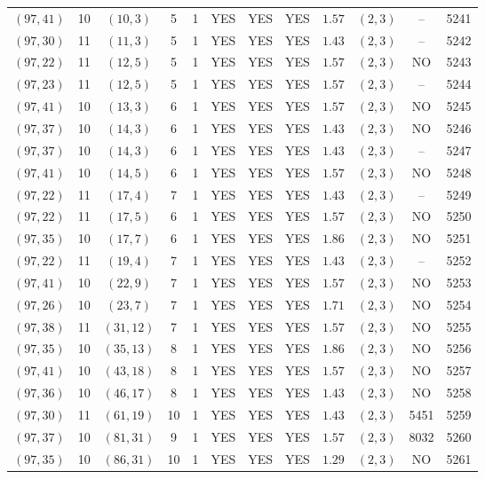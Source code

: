 \begin{longtable}{|c|c|c|c|c|c|c|c|c|c|c|c|}
$(97,41)$ & 10 & $(10,3)$ & 5 & 1 & YES & YES & YES & $1.57$ & $(2,3)$ & -- & 5241\\
$(97,30)$ & 11 & $(11,3)$ & 5 & 1 & YES & YES & YES & $1.43$ & $(2,3)$ & -- & 5242\\
$(97,22)$ & 11 & $(12,5)$ & 5 & 1 & YES & YES & YES & $1.57$ & $(2,3)$ & NO & 5243\\
$(97,23)$ & 11 & $(12,5)$ & 5 & 1 & YES & YES & YES & $1.57$ & $(2,3)$ & -- & 5244\\
$(97,41)$ & 10 & $(13,3)$ & 6 & 1 & YES & YES & YES & $1.57$ & $(2,3)$ & NO & 5245\\
$(97,37)$ & 10 & $(14,3)$ & 6 & 1 & YES & YES & YES & $1.43$ & $(2,3)$ & NO & 5246\\
$(97,37)$ & 10 & $(14,3)$ & 6 & 1 & YES & YES & YES & $1.43$ & $(2,3)$ & -- & 5247\\
$(97,41)$ & 10 & $(14,5)$ & 6 & 1 & YES & YES & YES & $1.57$ & $(2,3)$ & NO & 5248\\
$(97,22)$ & 11 & $(17,4)$ & 7 & 1 & YES & YES & YES & $1.43$ & $(2,3)$ & -- & 5249\\
$(97,22)$ & 11 & $(17,5)$ & 6 & 1 & YES & YES & YES & $1.57$ & $(2,3)$ & NO & 5250\\
$(97,35)$ & 10 & $(17,7)$ & 6 & 1 & YES & YES & YES & $1.86$ & $(2,3)$ & NO & 5251\\
$(97,22)$ & 11 & $(19,4)$ & 7 & 1 & YES & YES & YES & $1.43$ & $(2,3)$ & -- & 5252\\
$(97,41)$ & 10 & $(22,9)$ & 7 & 1 & YES & YES & YES & $1.57$ & $(2,3)$ & NO & 5253\\
$(97,26)$ & 10 & $(23,7)$ & 7 & 1 & YES & YES & YES & $1.71$ & $(2,3)$ & NO & 5254\\
$(97,38)$ & 11 & $(31,12)$ & 7 & 1 & YES & YES & YES & $1.57$ & $(2,3)$ & NO & 5255\\
$(97,35)$ & 10 & $(35,13)$ & 8 & 1 & YES & YES & YES & $1.86$ & $(2,3)$ & NO & 5256\\
$(97,41)$ & 10 & $(43,18)$ & 8 & 1 & YES & YES & YES & $1.57$ & $(2,3)$ & NO & 5257\\
$(97,36)$ & 10 & $(46,17)$ & 8 & 1 & YES & YES & YES & $1.43$ & $(2,3)$ & NO & 5258\\
$(97,30)$ & 11 & $(61,19)$ & 10 & 1 & YES & YES & YES & $1.43$ & $(2,3)$ & 5451 & 5259\\
$(97,37)$ & 10 & $(81,31)$ & 9 & 1 & YES & YES & YES & $1.57$ & $(2,3)$ & 8032 & 5260\\
$(97,35)$ & 10 & $(86,31)$ & 10 & 1 & YES & YES & YES & $1.29$ & $(2,3)$ & NO & 5261\\

\end{longtable}
